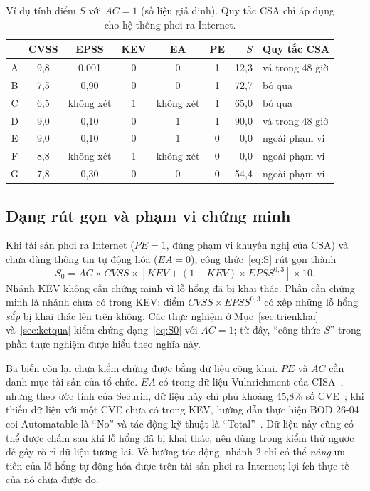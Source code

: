 \documentclass[runningheads]{llncs}
\begin{document}
\begin{table}
\centering
\caption{Ví dụ tính điểm $S$ với $AC = 1$ (số liệu giả định). Quy tắc CSA chỉ áp dụng cho hệ thống phơi ra Internet.}\label{tab:vidu}
\small
\begin{tabular}{ccccccrl}
\toprule
 & CVSS & EPSS & KEV & EA & PE & $S$ & Quy tắc CSA \\
\midrule
A & 9,8 & 0,001 & 0 & 0 & 1 & 12,3 & vá trong 48 giờ \\
B & 7,5 & 0,90 & 0 & 0 & 1 & 72,7 & bỏ qua \\
C & 6,5 & không xét & 1 & không xét & 1 & 65,0 & bỏ qua \\
D & 9,0 & 0,10 & 0 & 1 & 1 & 90,0 & vá trong 48 giờ \\
E & 9,0 & 0,10 & 0 & 1 & 0 & 0,0 & ngoài phạm vi \\
F & 8,8 & không xét & 1 & không xét & 0 & 0,0 & ngoài phạm vi \\
G & 7,8 & 0,30 & 0 & 0 & 0 & 54,4 & ngoài phạm vi \\
\bottomrule
\end{tabular}
\end{table}

\subsection{Dạng rút gọn và phạm vi chứng minh}

Khi tài sản phơi ra Internet ($\mathit{PE} = 1$, đúng phạm vi khuyến nghị của CSA) và chưa dùng thông
tin tự động hóa ($\mathit{EA} = 0$), công thức~\eqref{eq:S} rút gọn thành
\begin{equation}
S_0 = AC \times \mathit{CVSS} \times \left[\mathit{KEV} + (1-\mathit{KEV}) \times \mathit{EPSS}^{0{,}3}\right] \times 10.
\label{eq:S0}
\end{equation}
Nhánh KEV không cần chứng minh vì lỗ hổng đã bị khai thác. Phần cần chứng minh là nhánh chưa có trong KEV: điểm
$\mathit{CVSS} \times \mathit{EPSS}^{0{,}3}$ có xếp những lỗ hổng \emph{sắp} bị khai thác lên trên không.
Các thực nghiệm ở Mục~\ref{sec:trienkhai} và~\ref{sec:ketqua} kiểm chứng dạng~\eqref{eq:S0} với $AC = 1$;
từ đây, ``công thức $S$'' trong phần thực nghiệm được hiểu theo nghĩa này.

Ba biến còn lại chưa kiểm chứng được bằng dữ liệu công khai. $\mathit{PE}$ và $AC$ cần danh mục tài sản
của tổ chức. $\mathit{EA}$ có trong dữ liệu Vulnrichment của CISA~\cite{vulnrichment}, nhưng theo ước tính của Securin, dữ liệu này
chỉ phủ khoảng 45,8\% số CVE~\cite{securin2026}; khi thiếu dữ liệu với một CVE chưa có trong KEV, hướng dẫn thực hiện BOD 26-04 coi Automatable là ``No'' và tác động kỹ thuật là ``Total''~\cite{bod2604ig}. Dữ liệu này cũng có thể được chấm sau khi lỗ hổng
đã bị khai thác, nên dùng trong kiểm thử ngược dễ gây rò rỉ dữ liệu tương lai. Về hướng tác động, nhánh 2
chỉ có thể \emph{nâng} ưu tiên của lỗ hổng tự động hóa được trên tài sản phơi ra Internet; lợi ích thực tế
của nó chưa được đo.
\end{document}
